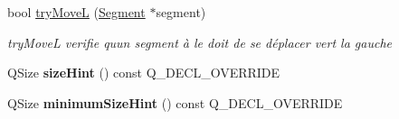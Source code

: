 \begin{DoxyCompactItemize}
bool \hyperlink{class_board_a58ab26b2c4e2dbc3312a95261b282adf}{try\+MoveL} (\hyperlink{class_segment}{Segment} $\ast$segment)
\begin{DoxyCompactList}\small\item\em try\+MoveL verifie qu\textquotesingle{}un segment à le doit de se déplacer vert la gauche \end{DoxyCompactList}\item 
Q\+Size {\bfseries size\+Hint} () const Q\+\_\+\+D\+E\+C\+L\+\_\+\+O\+V\+E\+R\+R\+I\+DE\hypertarget{class_board_a3a8c20b7452b2faf9cb9b9062c608113}{}\label{class_board_a3a8c20b7452b2faf9cb9b9062c608113}

\item 
Q\+Size {\bfseries minimum\+Size\+Hint} () const Q\+\_\+\+D\+E\+C\+L\+\_\+\+O\+V\+E\+R\+R\+I\+DE\hypertarget{class_board_a7073de6d1a8c9feeca5ed7d14361c113}{}\label{class_board_a7073de6d1a8c9feeca5ed7d14361c113}


\end{DoxyCompactItemize}
